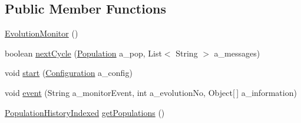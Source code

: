 \subsection*{Public Member Functions}
\begin{DoxyCompactItemize}
\item 
\hyperlink{classorg_1_1jgap_1_1audit_1_1_evolution_monitor_a294afadc9f2e15ba3d4a9ed5a5ed5682}{Evolution\-Monitor} ()
\item 
boolean \hyperlink{classorg_1_1jgap_1_1audit_1_1_evolution_monitor_a78284026de991d7ee6069a89c5ef00ae}{next\-Cycle} (\hyperlink{classorg_1_1jgap_1_1_population}{Population} a\-\_\-pop, List$<$ String $>$ a\-\_\-messages)
\item 
void \hyperlink{classorg_1_1jgap_1_1audit_1_1_evolution_monitor_a37fea3677480717e2af5a3a31a5e4ca9}{start} (\hyperlink{classorg_1_1jgap_1_1_configuration}{Configuration} a\-\_\-config)
\item 
void \hyperlink{classorg_1_1jgap_1_1audit_1_1_evolution_monitor_a7c53dc71860ea1f570d1e18371fd82ac}{event} (String a\-\_\-monitor\-Event, int a\-\_\-evolution\-No, Object\mbox{[}$\,$\mbox{]} a\-\_\-information)
\item 
\hyperlink{classorg_1_1jgap_1_1eval_1_1_population_history_indexed}{Population\-History\-Indexed} \hyperlink{classorg_1_1jgap_1_1audit_1_1_evolution_monitor_afd81245edfe850b2bd4776b37b85c0f3}{get\-Populations} ()
\end{DoxyCompactItemize}
